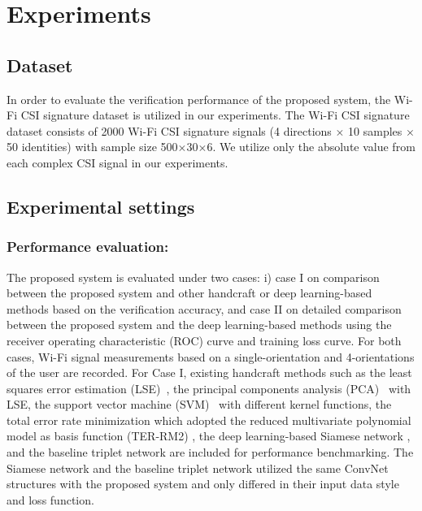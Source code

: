 \documentclass{sig-alternate-05-2015}
\begin{document}
\section{Experiments}

\subsection{Dataset}
 In order to evaluate the verification performance of the proposed system, the Wi-Fi CSI signature dataset \cite{moon2017air} is utilized in our experiments. The Wi-Fi CSI signature dataset consists of 2000 Wi-Fi CSI signature signals (4 directions $\times$ 10 samples $\times$ 50 identities) with sample size 500$\times$30$\times$6. We utilize only the absolute value from each complex CSI signal in our experiments.

\subsection{Experimental settings}

\subsubsection{Performance evaluation:}
The proposed system is evaluated under two cases: i) case I on comparison between the proposed system and other handcraft or deep learning-based methods based on the verification accuracy, and case II on detailed comparison between the proposed system and the deep learning-based methods using the receiver operating characteristic (ROC) curve and training loss curve. For both cases, Wi-Fi signal measurements based on a single-orientation and 4-orientations of the user are recorded. For Case I, existing handcraft methods such as the least squares error estimation (LSE)~\cite{duda2012pattern}, the principal components analysis (PCA)~\cite{turk1991eigenfaces} with LSE, the support vector machine (SVM)~\cite{vapnik2013nature} with different kernel functions, the total error rate minimization which adopted the reduced multivariate polynomial model as basis function (TER-RM2) \cite{toh2003fingerprint,toh2008between}, the deep learning-based Siamese network \cite{koch2015siamese}, and the baseline triplet network \cite{hoffer2015deep} are included for performance benchmarking. The Siamese network and the baseline triplet network utilized the same ConvNet structures with the proposed system and only differed in their input data style and loss function.
\end{document}

